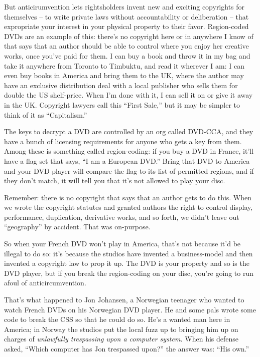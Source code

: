 But anticirumvention lets rightsholders invent new and exciting
copyrights for themselves -- to write private laws without
accountability or deliberation -- that expropriate your interest in
your physical property to their favor. Region-coded DVDs are an
example of this: there's no copyright here or in anywhere I know of
that says that an author should be able to control where you enjoy
her creative works, once you've paid for them. I can buy a book and
throw it in my bag and take it anywhere from Toronto to Timbuktu,
and read it wherever I am: I can even buy books in America and
bring them to the UK, where the author may have an exclusive
distribution deal with a local publisher who sells them for double
the US shelf-price. When I'm done with it, I can sell it on or give
it away in the UK. Copyright lawyers call this ``First Sale,'' but it
may be simpler to think of it as ``Capitalism.''

The keys to decrypt a DVD are controlled by an org called DVD-CCA,
and they have a bunch of licensing requirements for anyone who gets
a key from them. Among these is something called region-coding: if
you buy a DVD in France, it'll have a flag set that says, ``I am a
European DVD.'' Bring that DVD to America and your DVD player will
compare the flag to its list of permitted regions, and if they
don't match, it will tell you that it's not allowed to play your
disc.

Remember: there is no copyright that says that an author gets to do
this. When we wrote the copyright statutes and granted authors the
right to control display, performance, duplication, derivative
works, and so forth, we didn't leave out ``geography'' by accident.
That was on-purpose.

So when your French DVD won't play in America, that's not because
it'd be illegal to do so: it's because the studios have invented a
business-model and then invented a copyright law to prop it up. The
DVD is your property and so is the DVD player, but if you break the
region-coding on your disc, you're going to run afoul of
anticircumvention.

That's what happened to Jon Johansen, a Norwegian teenager who
wanted to watch French DVDs on his Norwegian DVD player. He and
some pals wrote some code to break the CSS so that he could do so.
He's a wanted man here in America; in Norway the studios put the
local fuzz up to bringing him up on charges of
\emph{unlawfully trespassing upon a computer system.} When his
defense asked, ``Which computer has Jon trespassed upon?'' the answer
was: ``His own.''

